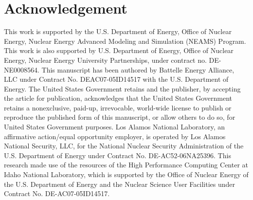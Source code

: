 \documentclass[review]{elsarticle}
\begin{document}
\section{Acknowledgement}
This work is supported by the U.S. Department of Energy, Office of Nuclear Energy, Nuclear Energy Advanced Modeling and Simulation (NEAMS) Program. This work is also supported by U.S. Department of Energy, Office of Nuclear Energy, Nuclear Energy University Partnerships, under contract no. DE-NE0008564. This manuscript has been authored by Battelle Energy Alliance, LLC under Contract No. DEAC07-05ID14517 with the U.S. Department of Energy. The United States Government retains and the publisher, by accepting the article for publication, acknowledges that the United States Government retains a nonexclusive, paid-up, irrevocable, world-wide license to publish or reproduce the published form of this manuscript, or allow others to do so, for United States Government purposes. Los Alamos National Laboratory, an affirmative action/equal opportunity employer, is operated by Los Alamos National Security, LLC, for the National Nuclear Security Administration of the U.S. Department of Energy under Contract No. DE-AC52-06NA25396. This research made use of the resources of the High Performance Computing Center at Idaho National Laboratory, which is supported by the Office of Nuclear Energy of the U.S. Department of Energy and the Nuclear Science User Facilities under Contract No. DE-AC07-05ID14517.
\end{document}
